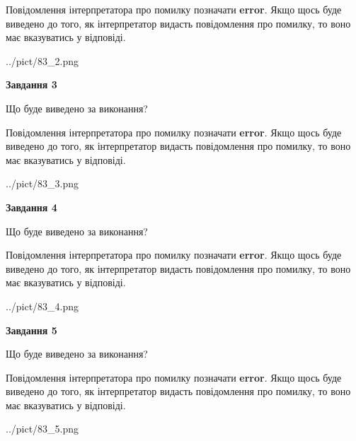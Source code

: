 \documentclass[12pt, ukrainian]{article}
\begin{document}
{\begin {large}
Повідомлення інтерпретатора про помилку позначати \textbf{error}.
Якщо щось буде виведено до того, як інтерпретатор видасть повідомлення про помилку, 
то воно має вказуватись у відповіді. \par


\begin{center}
	{../pict/83_2.png}
\end{center}
\newpage

{\begin {center}\textbf{Завдання 3}\end {center}}\par
Що буде виведено за виконання?

Повідомлення інтерпретатора про помилку позначати \textbf{error}.
Якщо щось буде виведено до того, як інтерпретатор видасть повідомлення про помилку, 
то воно має вказуватись у відповіді. \par


\begin{center}
	{../pict/83_3.png}
\end{center}
\newpage

{\begin {center}\textbf{Завдання 4}\end {center}}\par
Що буде виведено за виконання?

Повідомлення інтерпретатора про помилку позначати \textbf{error}.
Якщо щось буде виведено до того, як інтерпретатор видасть повідомлення про помилку, 
то воно має вказуватись у відповіді. \par


\begin{center}
	{../pict/83_4.png}
\end{center}
\newpage

{\begin {center}\textbf{Завдання 5}\end {center}}\par
Що буде виведено за виконання?

Повідомлення інтерпретатора про помилку позначати \textbf{error}.
Якщо щось буде виведено до того, як інтерпретатор видасть повідомлення про помилку, 
то воно має вказуватись у відповіді. \par


\begin{center}
	{../pict/83_5.png}
\end{center}
\newpage


\end{large}}
\end{document}
